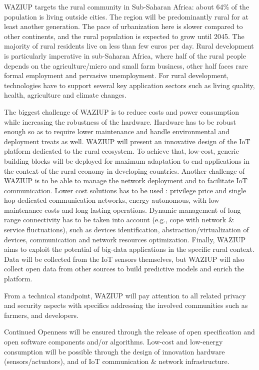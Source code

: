 WAZIUP targets the rural community in Sub-Saharan Africa: about 64\% of the population is living outside cities.
The region will be predominantly rural for at least another generation.
The pace of urbanization here is slower compared to other continents, and the rural population is expected to grow until 2045.
The majority of rural residents live on less than few euros per day.
Rural development is particularly imperative in sub-Saharan Africa, where half of the rural people depends on the agriculture/micro and small farm business, other half faces rare formal employment and pervasive unemployment.
For rural development, technologies have to support several key application sectors such as living quality, health, agriculture and climate changes.

The biggest challenge of WAZIUP is to reduce costs and power consumption while increasing the robustness of the hardware.
Hardware has to be robust enough so as to require lower maintenance and handle environmental and deployment treats as well.
WAZIUP will present an innovative design of the IoT platform dedicated to the rural ecosystem.
To achieve that, low-cost, generic building blocks will be deployed for maximum adaptation to end-applications in the context of the rural economy in developing countries.
Another challenge of WAZIUP is to be able to manage the network deployment and to facilitate IoT communication.
Lower cost solutions has to be used : privilege price and single hop dedicated communication networks, energy autonomous, with low maintenance costs and long lasting operations.
Dynamic management of long range connectivity has to be taken into account (e.g., cope with network \& service fluctuations), such as devices identification, abstraction/virtualization of devices, communication and network resources optimization.
Finally, WAZIUP aims to exploit the potential of big-data applications in the specific rural context.
Data will be collected from the IoT sensors themselves, but WAZIUP will also collect open data from other sources to build predictive models and enrich the platform.

From a technical standpoint, WAZIUP will pay attention to all related privacy and security aspects with specifics addressing the involved communities such as farmers, and developers.

Continued Openness will be ensured through the release of open specification and open software components and/or algorithms.
Low-cost and low-energy consumption will be possible through the design of innovation hardware (sensors/actuators), and of IoT communication \& network infrastructure.

